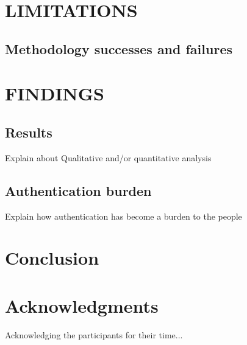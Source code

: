 \section{LIMITATIONS}
\subsection{Methodology successes and failures}
\section{FINDINGS}
\subsection{Results}
Explain about Qualitative and/or quantitative analysis
\subsection{Authentication burden}
Explain how authentication has become a burden to the people

\section{Conclusion}
\section*{Acknowledgments}
Acknowledging the participants for their time...







